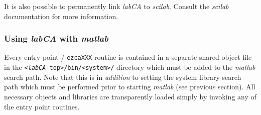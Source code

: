 \documentclass{article}
\newcommand{\sca}{{\em labCA}}
\newcommand{\scilab}{{\em scilab}}
\newcommand{\matlab}{{\em matlab}}
\begin{document}
It is also possible to permanently link \sca{} to \scilab{}. Consult
the \scilab{} documentation for more information.

\subsubsection{Using \sca{} with \matlab}
Every entry point / {\tt ezcaXXX} routine is contained in a separate
shared object file in the {\tt <\sca-top>/bin/<system>/} directory
which must be added to the \matlab{} search path.
Note that this is in {\em addition}
to setting the system library search path which must be performed prior
to starting \matlab{} (see previous section).
All necessary objects and libraries are transparently loaded simply
by invoking any of the entry point routines.
\end{document}
